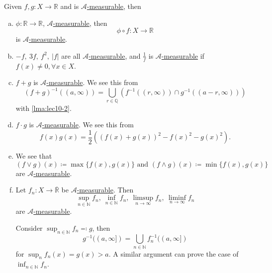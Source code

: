 \begin{remark}\label{rmk:Operations-preserve-measurability}
	Given \(f, g\colon X\to \mathbb{R} \) and is \hyperref[def:A-measurable-function]{\(\mathcal{A}\)-measurable}, then
	\begin{enumerate}[(a)]
		\item \(\phi \colon \mathbb{R} \to \mathbb{R} \), \hyperref[def:A-measurable-function]{\(\mathcal{A}\)-measurable}, then
		      \[
			      \phi \circ f\colon X\to \mathbb{R}
		      \]
		      is \hyperref[def:A-measurable-function]{\(\mathcal{A}\)-measurable}.
		\item \(-f,\ 3f,\ f^2,\ \left\vert f \right\vert \) are all \hyperref[def:A-measurable-function]{\(\mathcal{A} \)-measurable}, and \(\frac{1}{f}\) is \hyperref[def:A-measurable-function]{\(\mathcal{A}\)-measurable} if \(f(x)\neq 0, \forall x\in X\).
		\item \(f+g\) is \hyperref[def:A-measurable-function]{\(\mathcal{A}\)-measurable}. We see this from
		      \[
			      (f+g)^{-1} ((a, \infty ))=\bigcup_{r\in\mathbb{Q}} \left(f^{-1} ((r, \infty ))\cap g^{-1} ((a-r, \infty ))\right)
		      \]
		      with \autoref{lma:lec10-2}.
		\item \(f\cdot g\) is \hyperref[def:A-measurable-function]{\(\mathcal{A}\)-measurable}. We see this from
		      \[
			      f(x)g(x) = \frac{1}{2}\left((f(x)+g(x))^2 - f(x)^2 - g(x)^2\right).
		      \]
		\item We see that
		      \[
			      (f\vee g)(x)\coloneqq \max \{f(x), g(x)\}\text{ and }(f\wedge g)(x)\coloneqq \min\{f(x), g(x)\}
		      \]
		      are \hyperref[def:A-measurable-function]{\(\mathcal{A}\)-measurable}.
		\item Let \(f_{n}\colon X\to \overline{\mathbb{R} }\) be \hyperref[def:A-measurable-function]{\(\mathcal{A}\)-measurable}. Then
		      \[
			      \sup_{n\in\mathbb{N} } f_{n},\ \inf_{n\in\mathbb{N} } f_{n},\ \limsup_{n\to \infty} f_{n},\ \liminf_{n\to \infty} f_{n}
		      \]
		      are \hyperref[def:A-measurable-function]{\(\mathcal{A}\)-measurable}.
		      \begin{explanation}
			      Consider \(\sup_{n\in\mathbb{N} } f_{n} \eqqcolon g\), then
			      \[
				      g^{-1} ((a, \infty ]) = \bigcup_{n\in\mathbb{N}} f_{n}^{-1} ((a, \infty ])
			      \]
			      for \(\sup_n f_{n}(x) = g(x)>a\). A similar argument can prove the case of \(\inf_{n\in\mathbb{N} } f_{n}\).


\end{explanation}
\end{enumerate}
\end{remark}
